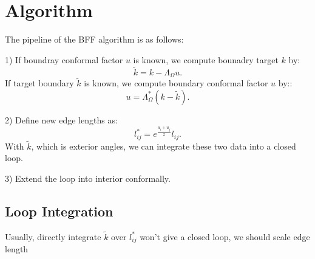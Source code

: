 \section{Algorithm}

The pipeline of the BFF algorithm is as follows:

1) If boundray conformal factor ${u}$ is known, we compute bounadry target $k$ by: $$ \tilde{k} = k -\Lambda_{\Omega} u.$$
If target boundary $\tilde{k}$ is known, we compute boundary conformal factor $u$ by:: $$u = \Lambda_{\Omega}^{*}(k - \tilde{k}).$$

2) Define new edge lengths as:
$$l_{ij}^* = e^{\frac{u_i + u_j}{2}}l_{ij}.$$ With $\tilde{k}$, which is exterior angles, we can integrate these two data into a closed loop.

3) Extend the loop into interior conformally.


\subsection{Loop Integration}
Usually, directly integrate $\tilde{k}$ over $l_{ij}^*$ won't give a closed loop, we should scale edge length









